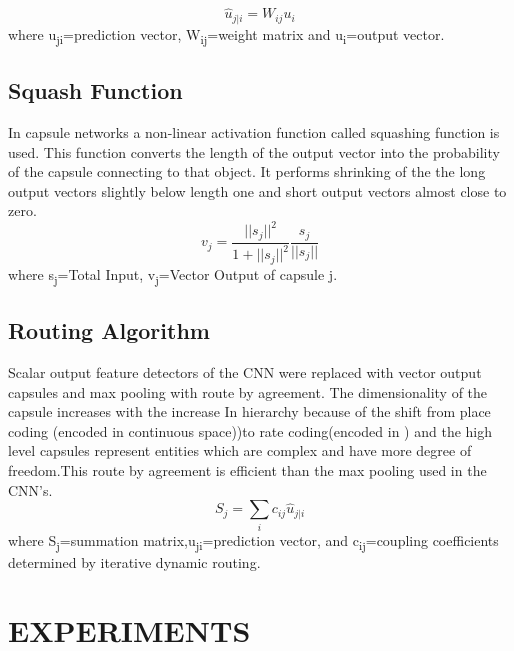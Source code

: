 \documentclass[letterpaper, 10 pt, conference]{ieeeconf}  %
\begin{document}


$$
\hat{u}_{j|i} = W_{ij}u_{i}  
$$
where u\textsubscript{j\textbar i}=prediction vector, W\textsubscript{ij}=weight matrix and u\textsubscript{i}=output vector.
\subsection{Squash Function}
In capsule networks a non-linear activation function called squashing function\cite{sabour2017dynamic} is used. This function converts the length of the output vector into the probability of the capsule connecting to that object. It performs shrinking of the the long output vectors slightly below length one and short output vectors almost close to zero.
\newline
$$
v_{j}=\frac{||s_{j}||^{2}}{1+||s_{j}||^{2}} \frac{s_{j}}{||s_{j}||}
$$
where s\textsubscript{j}=Total Input, v\textsubscript{j}=Vector Output of capsule j.

\subsection{Routing Algorithm}
Scalar output feature detectors of the CNN were replaced with vector output capsules\cite{hinton2011transforming} and max pooling with route by agreement. The dimensionality of the capsule increases with the increase In hierarchy because of the shift from place coding (encoded in continuous space))to rate coding(encoded in ) and the high level capsules represent entities which are complex and have more degree of freedom.This route by agreement is efficient than the max pooling used in the CNN’s.
$$
S_{j} = \sum_i c_{ij}\hat{u}_{j|i}
$$
where S\textsubscript{j}=summation matrix,u\textsubscript{j\textbar i}=prediction vector, and c\textsubscript{ij}=coupling coefficients determined by iterative dynamic routing.
\section{EXPERIMENTS}
\end{document}
